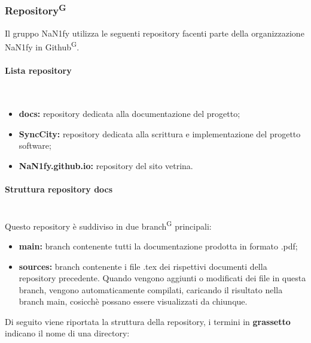 \documentclass[8pt]{article}
\newcommand{\glossterm}[1]{#1\textsuperscript{G}} %
\newcommand{\subsubsubsection}[1]{\paragraph{#1}\mbox{}\\}
\begin{document}
\subsubsection{\glossterm{Repository}}
Il gruppo NaN1fy utilizza le seguenti repository facenti parte della organizzazione NaN1fy in \glossterm{Github}.
\subsubsubsection{Lista repository}
\begin{itemize}
    \item \textbf{docs:} repository dedicata alla documentazione del progetto;
    \item \textbf{SyncCity:} repository dedicata alla scrittura e implementazione del progetto software;
    \item \textbf{NaN1fy.github.io:} repository del sito vetrina.
\end{itemize}
\subsubsubsection{Struttura repository docs}
Questo repository è suddiviso in due \glossterm{branch} principali:
\begin{itemize}
    \item \textbf{main:} branch contenente tutti la documentazione prodotta in formato .pdf;
    \item \textbf{sources:} branch contenente i file .tex dei rispettivi documenti della repository
        precedente. Quando vengono aggiunti o modificati dei file in questa branch, vengono
        automaticamente compilati, caricando il risultato nella branch main, cosicchè possano essere visualizzati da chiunque.
\end{itemize}
Di seguito viene riportata la struttura della repository, i termini in \textbf{grassetto} indicano il nome di una directory:
\end{document}
